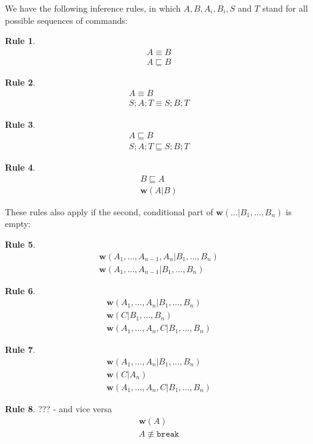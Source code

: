 \documentclass[12pt]{article}
\newcommand{\cbrk}{\mathtt{break}}
\newcommand{\eqext}{\sqsubseteq}
\newcommand{\nequiv}{\not\equiv}
\newcommand{\works}[1]{{\mathbf{w}}({#1})}
\newcommand{\worksc}[2]{{\mathbf{w}}({#1}|{#2})}
\newcommand{\infer}[2]{\begin{array}{c}{#1}\\\hline{#2}\end{array}}
\newcommand{\inferr}[3]{\begin{array}{c}{#1}\\{#2}\\\hline{#3}\end{array}}
\theoremstyle{definition}
\newtheorem{myrul}{Rule}
\begin{document}
We have the following inference rules, in which $A,B,A_i,B_i,S$ and $T$ stand for all possible sequences of commands:


\begin{myrul}\label{r_eq_ex}
\[\infer{A\equiv B}{A\eqext B}\]
\end{myrul}

\begin{myrul}
\[\infer{A\equiv B}{S;A;T\equiv S;B;T}\]
\end{myrul}

\begin{myrul}
\[\infer{A\eqext B}{S;A;T\eqext S;B;T}\]
\end{myrul}

\begin{myrul}\label{r_ex_w}
\[\infer{B\eqext A}{\worksc{A}{B}}\]
\end{myrul}

These rules also apply if the second, conditional part of $\worksc{\ldots}{B_1,\ldots,B_n}$ is empty:

\begin{myrul}
\[\infer{\worksc{A_1,\ldots,A_{n-1},A_n}{B_1,\ldots,B_n}}{\worksc{A_1,\ldots,A_{n-1}}{B_1,\ldots,B_n}}\]
\end{myrul}


\begin{myrul}\label{r_w_combine}
\[\inferr{\worksc{A_1,\ldots,A_n}{B_1,\ldots,B_n}}{\worksc{C}{B_1,\ldots,B_n}}{\worksc{A_1,\ldots,A_n,C}{B_1,\ldots,B_n}}\]
\end{myrul}

\begin{myrul}\label{r_w_w}
\[\inferr{\worksc{A_1,\ldots,A_n}{B_1,\ldots,B_n}}{\worksc{C}{A_n}}{\worksc{A_1,\ldots,A_n,C}{B_1,\ldots,B_n}}\]
\end{myrul}


\begin{myrul}{??? - and vice versa}
\[\infer{\works{A}}{A\nequiv\cbrk}\]
\end{myrul}
\end{document}
